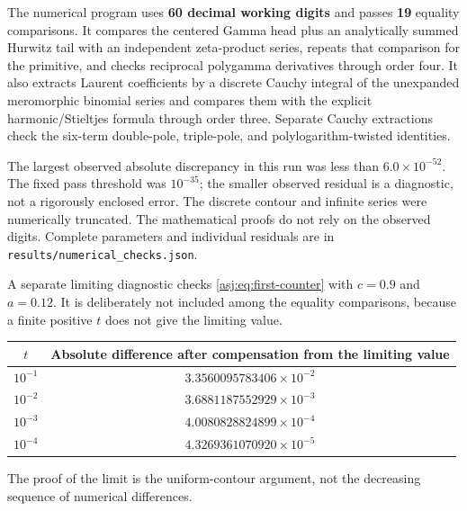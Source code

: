The numerical program uses \textbf{60 decimal working digits} and passes
\textbf{19} equality comparisons. It compares the centered Gamma head
plus an analytically summed Hurwitz tail with an independent zeta-product
series, repeats that comparison for the primitive, and checks reciprocal
polygamma derivatives through order four. It also extracts Laurent
coefficients by a discrete Cauchy integral of the unexpanded meromorphic
binomial series and compares them with the explicit harmonic/Stieltjes
formula through order three. Separate Cauchy extractions check the
six-term double-pole, triple-pole, and polylogarithm-twisted identities.

The largest observed absolute discrepancy in this run was less than
$6.0\times10^{-52}$. The fixed pass threshold was $10^{-35}$; the
smaller observed residual is a diagnostic, not a rigorously enclosed
error. The discrete contour and infinite series were numerically
truncated. The mathematical proofs do not rely on the observed digits.
Complete parameters and individual residuals are in
\texttt{results/numerical\_checks.json}.

A separate limiting diagnostic checks \eqref{asj:eq:first-counter} with
$c=0.9$ and $a=0.12$. It is deliberately not included among the equality
comparisons, because a finite positive $t$ does not give the limiting value.
\begin{center}
\begin{tabular}{@{}cc@{}}\toprule
$t$ & Absolute difference after compensation from the limiting value\\\midrule
$10^{-1}$ & $3.3560095783406\times10^{-2}$\\
$10^{-2}$ & $3.6881187552929\times10^{-3}$\\
$10^{-3}$ & $4.0080828824899\times10^{-4}$\\
$10^{-4}$ & $4.3269361070920\times10^{-5}$\\\bottomrule
\end{tabular}
\end{center}
The proof of the limit is the uniform-contour argument, not the decreasing
sequence of numerical differences.

